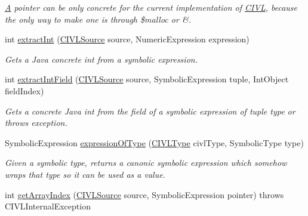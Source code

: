 \begin{DoxyCompactItemize}
\begin{DoxyCompactList}\small\item\em \hyperlink{structA}{A} pointer can be only concrete for the current implementation of \hyperlink{classedu_1_1udel_1_1cis_1_1vsl_1_1civl_1_1CIVL}{C\+I\+V\+L}, because the only way to make one is through {\ttfamily \$malloc} or {\ttfamily \&}. \end{DoxyCompactList}\item 
int \hyperlink{classedu_1_1udel_1_1cis_1_1vsl_1_1civl_1_1dynamic_1_1common_1_1CommonSymbolicUtility_ad4e3d9eec8877d1600c42b976193c708}{extract\+Int} (\hyperlink{interfaceedu_1_1udel_1_1cis_1_1vsl_1_1civl_1_1model_1_1IF_1_1CIVLSource}{C\+I\+V\+L\+Source} source, Numeric\+Expression expression)
\begin{DoxyCompactList}\small\item\em Gets a Java concrete int from a symbolic expression. \end{DoxyCompactList}\item 
int \hyperlink{classedu_1_1udel_1_1cis_1_1vsl_1_1civl_1_1dynamic_1_1common_1_1CommonSymbolicUtility_ae4dd5da9c701d7921a0a75ce4632b8a3}{extract\+Int\+Field} (\hyperlink{interfaceedu_1_1udel_1_1cis_1_1vsl_1_1civl_1_1model_1_1IF_1_1CIVLSource}{C\+I\+V\+L\+Source} source, Symbolic\+Expression tuple, Int\+Object field\+Index)
\begin{DoxyCompactList}\small\item\em Gets a concrete Java int from the field of a symbolic expression of tuple type or throws exception. \end{DoxyCompactList}\item 
Symbolic\+Expression \hyperlink{classedu_1_1udel_1_1cis_1_1vsl_1_1civl_1_1dynamic_1_1common_1_1CommonSymbolicUtility_a46cdc7af0f0389429057e9c994c49c2e}{expression\+Of\+Type} (\hyperlink{interfaceedu_1_1udel_1_1cis_1_1vsl_1_1civl_1_1model_1_1IF_1_1type_1_1CIVLType}{C\+I\+V\+L\+Type} civl\+Type, Symbolic\+Type type)
\begin{DoxyCompactList}\small\item\em Given a symbolic type, returns a canonic symbolic expression which somehow wraps that type so it can be used as a value. \end{DoxyCompactList}\item 
int \hyperlink{classedu_1_1udel_1_1cis_1_1vsl_1_1civl_1_1dynamic_1_1common_1_1CommonSymbolicUtility_a2a4ae7f805372c9f755400db506a16d7}{get\+Array\+Index} (\hyperlink{interfaceedu_1_1udel_1_1cis_1_1vsl_1_1civl_1_1model_1_1IF_1_1CIVLSource}{C\+I\+V\+L\+Source} source, Symbolic\+Expression pointer)  throws C\+I\+V\+L\+Internal\+Exception 

\end{DoxyCompactItemize}
